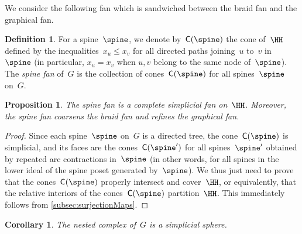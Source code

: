 \documentclass{amsart}
\newtheorem{corollary}[theorem]{Corollary}
\newtheorem{proposition}[theorem]{Proposition}
\theoremstyle{definition}
\newtheorem{definition}[theorem]{Definition}
\renewcommand{\b}[1]{{\boldsymbol{#1}}} %
\newcommand{\set}[2]{\left\{ #1 \;\middle|\; #2 \right\}} %
\newcommand{\eqdef}{\mbox{\,\raisebox{0.2ex}{\scriptsize\ensuremath{\mathrm:}}\ensuremath{=}\,}} %
\newcommand{\darkblue}{\color{darkblue}} %
\newcommand{\defn}[1]{\textsl{\darkblue #1}} %
\newcommand{\vincent}[1]{\todo[color=blue!30]{#1 \\ \hfill --- V.}}
\newcommand{\normalCone}{\mathsf{C}} %
\begin{document}
We consider the following fan which is sandwiched between the braid fan and the graphical fan.

\begin{definition}
  \label{def:spineFan}
  For a spine~$\spine$, we denote by~$\normalCone(\spine)$ the cone of~$\HH$ defined by the inequalities~$x_u \le x_v$ for all directed paths joining~$u$ to~$v$ in~$\spine$ (in particular, $x_u = x_v$ when $u,v$ belong to the same node of~$\spine$).
  The \defn{spine fan} of~$G$ is the collection of cones~$\normalCone(\spine)$ for all spines~$\spine$ on~$G$.  
\end{definition}

\begin{proposition}
  \label{prop:spineFan}
  The spine fan is a complete simplicial fan on~$\HH$.
  Moreover, the spine fan coarsens the braid fan and refines the graphical fan.
\end{proposition}

\begin{proof}
  Since each spine~$\spine$ on~$G$ is a directed tree, the cone~$\normalCone(\spine)$ is simplicial, and its faces are the cones~$\normalCone(\spine')$ for all spines~$\spine'$ obtained by repeated arc contractions in~$\spine$ (in other words, for all spines in the lower ideal of the spine poset generated by~$\spine$).
  We thus just need to prove that the cones~$\normalCone(\spine)$ properly intersect and cover~$\HH$, or equivalently, that the relative interiors of the cones~$\normalCone(\spine)$ partition~$\HH$.
  This immediately follows from \cref{subsec:surjectionMaps}.
  \vincent{Be more precise here.}
\end{proof}

\begin{corollary} 
   The nested complex of~$G$ is a simplicial sphere.
\end{corollary}

%

\end{document}
